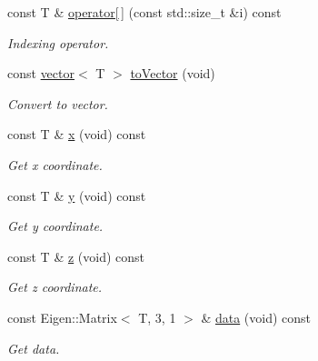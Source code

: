 \begin{DoxyCompactItemize}
const T \& \hyperlink{classddd_1_1point_a320e2bfca11915c5ebb9ed0581a3cab1}{operator\mbox{[}$\,$\mbox{]}} (const std\+::size\+\_\+t \&i) const
\begin{DoxyCompactList}\small\item\em Indexing operator. \end{DoxyCompactList}\item 
\mbox{\label{classddd_1_1point_ae5cdb6da78fde0df6e2a7e04ac3d799d}} 
const \hyperlink{classddd_1_1vector}{vector}$<$ T $>$ \hyperlink{classddd_1_1point_ae5cdb6da78fde0df6e2a7e04ac3d799d}{to\+Vector} (void)
\begin{DoxyCompactList}\small\item\em Convert to vector. \end{DoxyCompactList}\item 
\mbox{\label{classddd_1_1point_af165c07ef348f3d795469b8b0918a3ba}} 
const T \& \hyperlink{classddd_1_1point_af165c07ef348f3d795469b8b0918a3ba}{x} (void) const
\begin{DoxyCompactList}\small\item\em Get x coordinate. \end{DoxyCompactList}\item 
\mbox{\label{classddd_1_1point_a632f731dfcc4cc1693948d861cb7327d}} 
const T \& \hyperlink{classddd_1_1point_a632f731dfcc4cc1693948d861cb7327d}{y} (void) const
\begin{DoxyCompactList}\small\item\em Get y coordinate. \end{DoxyCompactList}\item 
\mbox{\label{classddd_1_1point_aeb266a3811a70700ee7d52cacfdc0b9f}} 
const T \& \hyperlink{classddd_1_1point_aeb266a3811a70700ee7d52cacfdc0b9f}{z} (void) const
\begin{DoxyCompactList}\small\item\em Get z coordinate. \end{DoxyCompactList}\item 
\mbox{\label{classddd_1_1point_a7589c5f8a9b9a93803dd050ebc9b54a0}} 
const Eigen\+::\+Matrix$<$ T, 3, 1 $>$ \& \hyperlink{classddd_1_1point_a7589c5f8a9b9a93803dd050ebc9b54a0}{data} (void) const
\begin{DoxyCompactList}\small\item\em Get data. \end{DoxyCompactList}\item 

\end{DoxyCompactItemize}
